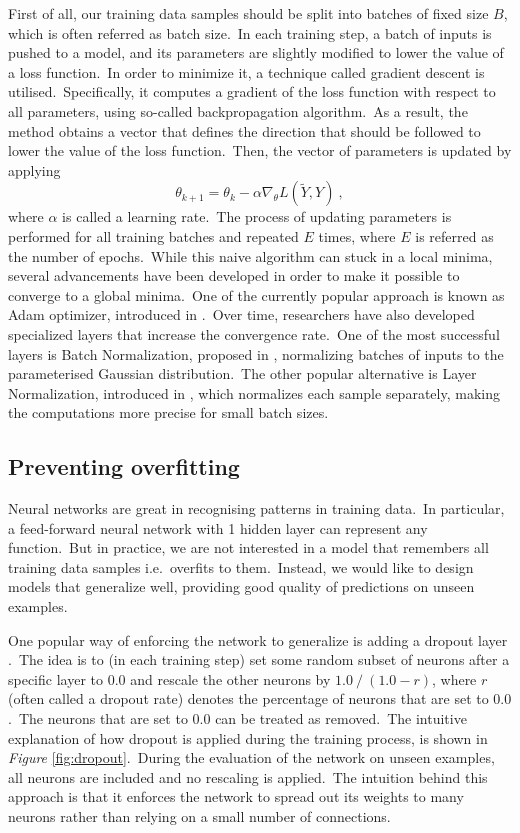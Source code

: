 \documentclass[longabstract, english, mgr]{iithesis}
\theoremstyle{default_theorem_style}\newtheorem{theorem}{Theorem}
\theoremstyle{default_theorem_style}\newtheorem{definition}{Definition}
\begin{document}
\noindent First of all, our training data samples should be split into batches of fixed size $B$, which is often
referred as batch size.\ In each training step, a batch of inputs is pushed to a model, and its parameters
are slightly modified to lower the value of a loss function.\ In order to minimize it, a technique called gradient
descent is utilised.\ Specifically, it computes a gradient of the loss function with respect to all parameters,
using so-called backpropagation algorithm.\ As a result, the method obtains a vector that defines the direction that
should be followed to lower the value of the loss function.\ Then, the vector of parameters is updated by applying
$$
\theta_{k + 1} = \theta_k - \alpha \nabla_{\theta} L(\tilde{Y}, Y)\ ,
$$
where $\alpha$ is called a learning rate.\ The process of updating parameters is performed for all training batches and
repeated $E$ times, where $E$ is referred as the number of epochs.\ While this naive algorithm can stuck in a
local minima, several advancements have been developed in order to make it possible to converge to a global minima.\ One
of the currently popular approach is known as Adam optimizer, introduced in \cite{adam_optimizer}.\ Over time,
researchers have also developed specialized layers that increase the convergence rate.\ One of the most successful
layers is Batch Normalization, proposed in \cite{batch_normalization}, normalizing batches of inputs to the
parameterised Gaussian distribution.\ The other popular alternative is Layer Normalization, introduced
in \cite{layer_normalization}, which normalizes each sample separately, making the computations more precise for
small batch sizes.

\subsection{Preventing overfitting}\label{subsec:overfitting}

Neural networks are great in recognising patterns in training data.\ In particular, a feed-forward neural network with
1 hidden layer can represent any function.\ But in practice, we are not interested in a model that remembers all
training data samples i.e.\ overfits to them.\ Instead, we would like to design models that generalize well, providing
good quality of predictions on unseen examples.\newline

\noindent One popular way of enforcing the network to generalize is adding a dropout layer \cite{dropout}.\ The
idea is to (in each training step) set some random subset of neurons after a specific layer
to $0.0$ and rescale the other neurons by $1.0\ /\ (1.0 - r)$, where $r$ (often called a dropout rate) denotes
the percentage of neurons that are set to $0.0$.\ The neurons that are set to $0.0$ can be treated as removed.\ The
intuitive explanation of how dropout is applied during the training process, is shown in
\textit{Figure} \ref{fig:dropout}.\ During the evaluation of the network on unseen examples, all neurons are included
and no rescaling is applied.\ The intuition behind this approach is that it enforces the network to spread out its
weights to many neurons rather than relying on a small number of connections.\newline
\end{document}
